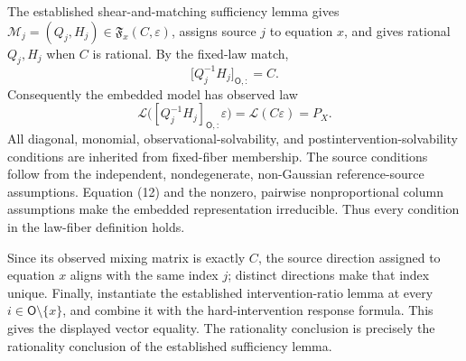 The established shear-and-matching sufficiency lemma gives \(\mathcal M_j=(Q_j,H_j)\in\mathfrak F_x(C,\varepsilon)\), assigns source \(j\) to equation \(x\), and gives rational \(Q_j,H_j\) when \(C\) is rational. By the fixed-law match,
\[
 \bigl[Q_j^{-1}H_j\bigr]_{\mathsf O,:}=C. \tag{12}
\]
Consequently the embedded model has observed law
\[
 \mathcal L\bigl([Q_j^{-1}H_j]_{\mathsf O,:}\varepsilon\bigr)
 =\mathcal L(C\varepsilon)=P_X. \tag{13}
\]
All diagonal, monomial, observational-solvability, and postintervention-solvability conditions are inherited from fixed-fiber membership. The source conditions follow from the independent, nondegenerate, non-Gaussian reference-source assumptions. Equation (12) and the nonzero, pairwise nonproportional column assumptions make the embedded representation irreducible. Thus every condition in the law-fiber definition holds.

Since its observed mixing matrix is exactly \(C\), the source direction assigned to equation \(x\) aligns with the same index \(j\); distinct directions make that index unique. Finally, instantiate the established intervention-ratio lemma at every \(i\in\mathsf O\setminus\{x\}\), and combine it with the hard-intervention response formula. This gives the displayed vector equality. The rationality conclusion is precisely the rationality conclusion of the established sufficiency lemma.